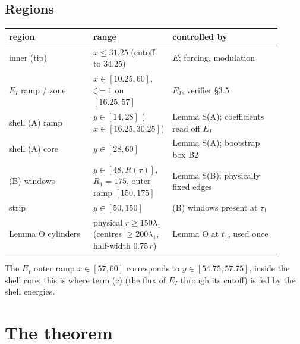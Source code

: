 \documentclass[11pt]{article}
\theoremstyle{definition}
\theoremstyle{remark}
\begin{document}
\subsection{Regions}
\begin{center}\small
\begin{tabular}{@{}p{0.31\linewidth}p{0.20\linewidth}p{0.40\linewidth}@{}}
\toprule region & range & controlled by\\\midrule
inner (tip) & $x\le31.25$ (cutoff to $34.25$) & $E$; forcing, modulation\\
$E_I$ ramp / zone & $x\in[10.25,60]$, $\zeta=1$ on $[16.25,57]$ & $E_I$, verifier \S3.5\\
shell (A) ramp & $y\in[14,28]$ ($x\in[16.25,30.25]$) & Lemma S(A); coefficients read off $E_I$\\
shell (A) core & $y\in[28,60]$ & Lemma S(A); bootstrap box B2\\
(B) windows & $y\in[48,R(\tau)]$, $R_1=175$, outer ramp $[150,175]$ & Lemma S(B); physically fixed edges\\
strip & $y\in[50,150]$ & (B) windows present at $\tau_1$\\
Lemma O cylinders & physical $r\ge150\lambda_1$ (centres $\ge200\lambda_1$, half-width $0.75\,r$) & Lemma O at $t_1$, used once\\
\bottomrule\end{tabular}\end{center}
The $E_I$ outer ramp $x\in[57,60]$ corresponds to $y\in[54.75,57.75]$, inside the shell core: this is where term (c) (the flux of $E_I$ through its cutoff) is fed by the shell energies.

\section{The theorem}
\end{document}
